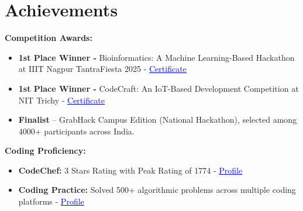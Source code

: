 \documentclass[letterpaper,10pt]{article}  %
\newcommand{\mysection}[1]{
\vspace{-7pt}
\section{#1}
}
\begin{document}

\mysection{Achievements}
\textbf{Competition Awards:}
\vspace{-3pt}
\begin{itemize}
\item \textbf{1st Place Winner -} Bioinformatics: A Machine Learning-Based Hackathon at IIIT Nagpur TantraFiesta 2025 - 
\href{https://drive.google.com/file/d/16v7WReH93eGHdTxvOXEf7nBYnGKDC8LN/view?usp=sharing}{\textcolor{blue}{\underline{Certificate}}}

\vspace{-2pt}

\item \textbf{1st Place Winner -} CodeCraft: An IoT-Based Development Competition at NIT Trichy -
\href{https://drive.google.com/file/d/1mJglco0o0uzFazz1Ko8KVC16SwBELV7k/view?usp=drive_link}{\textcolor{blue}{\underline{Certificate}}}\\
\vspace{-2pt}
\item \textbf{Finalist} – GrabHack Campus Edition (National Hackathon), selected among 4000+ participants across India.

\end{itemize}
\textbf{Coding Proficiency:}
\vspace{-3pt}
\begin{itemize}
\item \textbf{CodeChef:} 3 Stars Rating with Peak Rating of 1774 - 
{\href{https://www.codechef.com/users/lonely_dust_62}{\textcolor{blue}{\underline{Profile}}}}\\
\vspace{-2pt}

\item \textbf{Coding Practice:} Solved 500+ algorithmic problems across multiple coding platforms -
{\href{https://leetcode.com/u/syash6662/}{\textcolor{blue}{\underline{Profile}}}}
\end{itemize}
\end{document}
